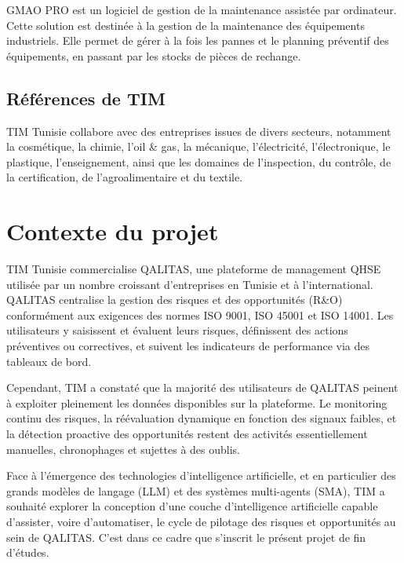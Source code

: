 GMAO PRO est un logiciel de gestion de la maintenance assistée par ordinateur. Cette solution est destinée à la gestion de la maintenance des équipements industriels. Elle permet de gérer à la fois les pannes et le planning préventif des équipements, en passant par les stocks de pièces de rechange.

\subsection{Références de TIM}

TIM Tunisie collabore avec des entreprises issues de divers secteurs, notamment la cosmétique, la chimie, l'oil \& gas, la mécanique, l'électricité, l'électronique, le plastique, l'enseignement, ainsi que les domaines de l'inspection, du contrôle, de la certification, de l'agroalimentaire et du textile.

\section{Contexte du projet}

TIM Tunisie commercialise QALITAS, une plateforme de management QHSE utilisée par un nombre croissant d'entreprises en Tunisie et à l'international. QALITAS centralise la gestion des risques et des opportunités (R\&O) conformément aux exigences des normes ISO 9001, ISO 45001 et ISO 14001. Les utilisateurs y saisissent et évaluent leurs risques, définissent des actions préventives ou correctives, et suivent les indicateurs de performance via des tableaux de bord.

Cependant, TIM a constaté que la majorité des utilisateurs de QALITAS peinent à exploiter pleinement les données disponibles sur la plateforme. Le monitoring continu des risques, la réévaluation dynamique en fonction des signaux faibles, et la détection proactive des opportunités restent des activités essentiellement manuelles, chronophages et sujettes à des oublis.

Face à l'émergence des technologies d'intelligence artificielle, et en particulier des grands modèles de langage (LLM) et des systèmes multi-agents (SMA), TIM a souhaité explorer la conception d'une couche d'intelligence artificielle capable d'assister, voire d'automatiser, le cycle de pilotage des risques et opportunités au sein de QALITAS. C'est dans ce cadre que s'inscrit le présent projet de fin d'études.

